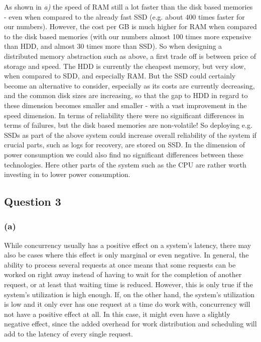 \documentclass[12pt,a4paper]{article}
\begin{document}
As shown in \emph{a)} the speed of RAM still a lot faster than the disk based memories - even when compared to the already fast SSD (e.g. about 400 times faster for our numbers). However, the cost per GB is much higher for RAM when compared to the disk based memories (with our numbers almost 100 times more expensive than HDD, and almost 30 times more than SSD). So when designing a distributed memory abstraction such as above, a first trade off is between price of storage and speed. The HDD is currently the cheapest memory, but very slow, when compared to SDD, and especially RAM. But the SSD could certainly become an alternative to consider, especially as its costs are currently decreasing, and the common disk sizes are increasing, so that the gap to HDD in regard to these dimension becomes smaller and smaller - with a vast improvement in the speed dimension. In terms of reliability there were no significant differences in terms of failures, but the disk based memories are non-volatile! So deploying e.g. SSDs as part of the above system could increase overall reliability of the system if crucial parts, such as logs for recovery, are stored on SSD. In the dimension of power consumption we could also find no significant differences between these technologies. Here other parts of the system such as the CPU are rather worth investing in to lower power consumption.

\subsection*{Question 3}
\label{sec:eq3}

\subsubsection*{(a)}
While concurrency usually has a positive effect on a system's latency, there may also be cases where this effect is only marginal or even negative. In general, the ability to process several requests at once means that some requests can be worked on right away instead of having to wait for the completion of another request, or at least that waiting time is reduced. However, this is only true if the system's utilization is high enough. If, on the other hand, the system's utilization is low and it only ever has one request at a time do work with, concurrency will not have a positive effect at all. In this case, it might even have a slightly negative effect, since the added overhead for work distribution and scheduling will add to the latency of every single request.
\end{document}
